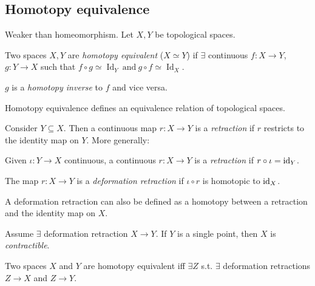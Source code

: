 \begin{multicols*}{3}
\subsection{Homotopy equivalence}
{\myfont Weaker than homeomorphism.} Let $X,Y$ be topological spaces.
\columnbreak
\begin{definition}
Two spaces $X, Y$ are \emph{homotopy equivalent} ($X \simeq Y$) if $\exists$ continuous $f:X\to Y$, $g:Y\to X$ such that
$ f\circ g \simeq \operatorname{Id}_Y\ \text{and} \ g\circ f \simeq \operatorname{Id}_X$.
\end{definition}
\rspace
\begin{defi}
$g$ is a \emph{homotopy inverse} to $f$ and vice versa.
\end{defi}
\rspace
\begin{remark}
Homotopy equivalence defines an equivalence relation of topological spaces.
\end{remark}\vspace{-0.6pc}
{\myfont Consider $Y\subseteq X$. Then a continuous map $r:X \to Y$ is a \emph{retraction} if $r$ restricts to the identity map on $Y$. More generally:}\vspace{-0.5pc}
\begin{definition}[Retraction]
Given $\iota: Y \to X$ continuous, a continuous $r:X\to Y$
is a \emph{retraction} if $r\circ \iota =\operatorname{id}_Y$.
\end{definition}
\rspace
\begin{defi}
The map $r:X\to Y$ is a \emph{deformation retraction} if $\iota\circ r$ is homotopic to $\operatorname{id}_X$.
\end{defi}
\rspace
\begin{rem}
A {deformation retraction} can also be defined as a homotopy between a retraction and the identity map on $X$.
\end{rem}
\rspace
\begin{defi}[Contractible]
Assume $\exists$ deformation retraction $X\to Y$. If $Y$ is a single point, then $X$ is \emph{contractible}.
\end{defi}
\rspace
\begin{remark}
Two spaces $X$ and $Y$ are homotopy equivalent iff $\exists Z$ s.t. $\exists$ deformation retractions $Z \to X$ and $Z \to Y$.
\end{remark}
\rspace
\drawaline \vspace{-0.5pc}

\end{multicols*}
